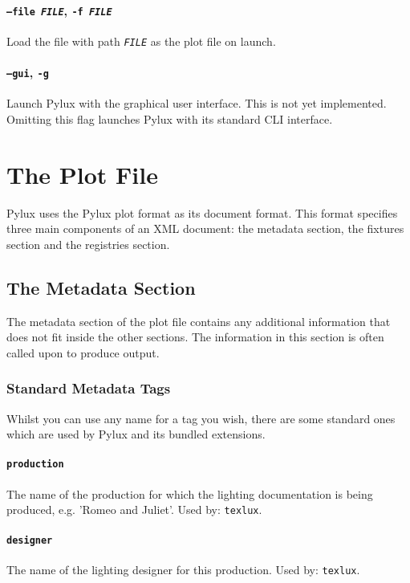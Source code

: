 \documentclass[a4paper]{article}
\begin{document}
\paragraph{\texttt{--file \textit{FILE}}, \texttt{-f \textit{FILE}}} 
Load the file with path \texttt{\textit{FILE}} as the plot file on launch.

\paragraph{\texttt{--gui}, \texttt{-g}}
Launch Pylux with the graphical user interface. This is not yet implemented. 
Omitting this flag launches Pylux with its standard CLI interface.

\section{The Plot File}
Pylux uses the Pylux plot format as its document format. This format 
specifies three main components of an XML document: the metadata section, the 
fixtures section and the registries section. 

\subsection{The Metadata Section}
The metadata section of the plot file contains any additional information 
that does not fit inside the other sections. The information in this section 
is often called upon to produce output.

\subsubsection{Standard Metadata Tags}
Whilst you can use any name for a tag you wish, there are some standard ones 
which are used by Pylux and its bundled extensions.

\paragraph{\texttt{production}}
The name of the production for which the lighting documentation is being 
produced, e.g. 'Romeo and Juliet'. Used by: \texttt{texlux}.

\paragraph{\texttt{designer}}
The name of the lighting designer for this production. Used by: 
\texttt{texlux}.
\end{document}
